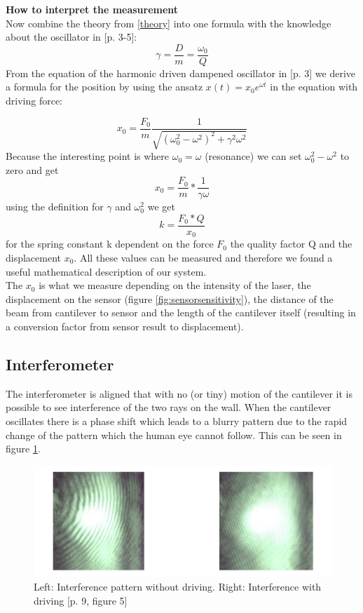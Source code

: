 \documentclass[12pt,a4paper]{article}
\begin{document}
\textbf{How to interpret the measurement}\\
Now combine the theory from \ref{theory} into one formula with the knowledge about the oscillator in \cite{physikwiki}[p. 3-5]:
$$\gamma = \frac{D}{m} = \frac{\omega_0}{Q}$$
From the equation of the harmonic driven dampened oscillator in \cite{physikwiki}[p. 3] we derive a formula for the position by using the ansatz $x(t) = x_0 e^{\omega t}$ in the equation with driving force:

$$x_0 = \frac{F_0}{m}  \frac{1}{\sqrt{ (\omega_0^2 - \omega^2 )^2 + \gamma^2  \omega^2}}$$
Because the interesting point is where $\omega_0 = \omega$ (resonance) we can set $\omega_0^2 - \omega^2$ to zero and get
$$x_0 = \frac{F_0}{m} * \frac{1}{\gamma  \omega}$$
using the definition for $\gamma$ and $\omega_0^2$ we get
$$k = \frac{F_0 * Q}{x_0}$$
for the spring constant k dependent on the force $F_0$ the quality factor Q and the displacement $x_0$. All these values can be measured and therefore we found a useful mathematical description of our system.\\
The $x_0$ is what we measure depending on the intensity of the laser, the displacement on the sensor (figure \ref{fig:sensorsensitivity}), the distance of the beam from cantilever to sensor and the length of the cantilever itself (resulting in a conversion factor from sensor result to displacement).\\

\subsection{Interferometer}
The interferometer is aligned that with no (or tiny) motion of the cantilever it is possible to see interference of the two rays on the wall. When the cantilever oscillates there is a phase shift which leads to a blurry pattern due to the rapid change of the pattern which the human eye cannot follow. This can be seen in figure \ref{fig:pattern}.

\begin{figure}[H]
	\centering
	\includegraphics[scale=1]{../figures/interference.png}
	\caption{Left: Interference pattern without driving. Right: Interference with driving \cite{physikwiki}[p. 9, figure 5]}
	\label{fig:pattern}
\end{figure}
\end{document}
